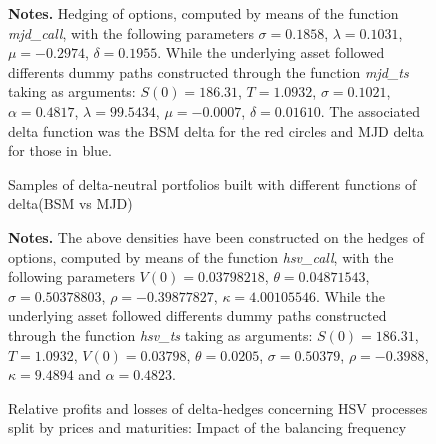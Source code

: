 \documentclass[a4paper, 12pt]{report}
\begin{document}
\begin{appendices}


\begin{figure}[h]
  \centering
  
  \caption{Samples of delta-neutral portfolios built with different functions of delta(BSM vs MJD)}
  \begin{changemargin}{0.5cm}{0.5cm}
  \medskip
\footnotesize
{}\textbf{Notes.} Hedging of options, computed by means of the function \textit{mjd\_call}, with the following parameters $\sigma = 0.1858$, $\lambda = 0.1031$, $\mu = -0.2974$, $\delta = 0.1955$. While the underlying asset followed differents dummy paths constructed through the function \textit{mjd\_ts} taking as arguments: $S(0) = 186.31$, $T = 1.0932$, $\sigma = 0.1021$, $\alpha = 0.4817$, $\lambda = 99.5434$, $\mu = -0.0007$, $\delta = 0.01610$. The associated delta function was the BSM delta for the red circles and MJD delta for those in blue.
  \end{changemargin}
  \label{p:analysis:mjd:hedge:deltas}
\end{figure}






\begin{figure}[h]
  \centering
  
  \caption{Relative profits and losses of delta-hedges concerning HSV processes split by prices and maturities: Impact of the balancing frequency}
  \begin{changemargin}{0.5cm}{0.5cm}
  \medskip
\footnotesize
{}\textbf{Notes.} The above densities have been constructed on the hedges of options, computed by means of the function \textit{hsv\_call}, with the following parameters $V(0) = 0.03798218$, $\theta = 0.04871543$, $\sigma = 0.50378803$, $\rho = -0.39877827$, $\kappa = 4.00105546$. While the underlying asset followed differents dummy paths constructed through the function \textit{hsv\_ts} taking as arguments: $S(0) = 186.31$, $T = 1.0932$, $V(0) = 0.03798$, $\theta = 0.0205$, $\sigma = 0.50379$, $\rho = -0.3988$,  $\kappa = 9.4894$ and $\alpha  = 0.4823$. 
  \end{changemargin}
  \label{p:analysis:hsv:pl:dist:big}
\end{figure}







\end{appendices}
\end{document}

